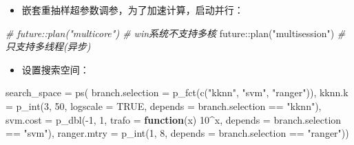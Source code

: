 \documentclass[
  11pt,
  ignorenonframetext,
  dvipsnames,UTF8]{beamer}
\newenvironment{Shaded}{\begin{snugshade}}{\end{snugshade}}
\newcommand{\AttributeTok}[1]{\textcolor[rgb]{0.77,0.63,0.00}{#1}}
\newcommand{\CommentTok}[1]{\textcolor[rgb]{0.56,0.35,0.01}{\textit{#1}}}
\newcommand{\ConstantTok}[1]{\textcolor[rgb]{0.00,0.00,0.00}{#1}}
\newcommand{\ControlFlowTok}[1]{\textcolor[rgb]{0.13,0.29,0.53}{\textbf{#1}}}
\newcommand{\DecValTok}[1]{\textcolor[rgb]{0.00,0.00,0.81}{#1}}
\newcommand{\FunctionTok}[1]{\textcolor[rgb]{0.00,0.00,0.00}{#1}}
\newcommand{\NormalTok}[1]{#1}
\newcommand{\OtherTok}[1]{\textcolor[rgb]{0.56,0.35,0.01}{#1}}
\newcommand{\SpecialCharTok}[1]{\textcolor[rgb]{0.00,0.00,0.00}{#1}}
\newcommand{\StringTok}[1]{\textcolor[rgb]{0.31,0.60,0.02}{#1}}
\providecommand{\tightlist}{%
  \setlength{\itemsep}{0pt}\setlength{\parskip}{0pt}}
\begin{document}
\begin{frame}[fragile]{}
\protect\hypertarget{section-41}{}
\begin{itemize}
\tightlist
\item
  嵌套重抽样超参数调参，为了加速计算，启动并行：
\end{itemize}

\begin{Shaded}
\begin{Highlighting}[]
\CommentTok{\# future::plan("multicore")      \# win系统不支持多核}
\NormalTok{future}\SpecialCharTok{::}\FunctionTok{plan}\NormalTok{(}\StringTok{"multisession"}\NormalTok{)     }\CommentTok{\# 只支持多线程(异步)}
\end{Highlighting}
\end{Shaded}

\begin{itemize}
\tightlist
\item
  设置搜索空间：
\end{itemize}

\begin{Shaded}
\begin{Highlighting}[]
\NormalTok{search\_space }\OtherTok{=} \FunctionTok{ps}\NormalTok{(}
  \AttributeTok{branch.selection =} \FunctionTok{p\_fct}\NormalTok{(}\FunctionTok{c}\NormalTok{(}\StringTok{"kknn"}\NormalTok{, }\StringTok{"svm"}\NormalTok{, }\StringTok{"ranger"}\NormalTok{)),}
  \AttributeTok{kknn.k =} \FunctionTok{p\_int}\NormalTok{(}\DecValTok{3}\NormalTok{, }\DecValTok{50}\NormalTok{, }\AttributeTok{logscale =} \ConstantTok{TRUE}\NormalTok{, }
                 \AttributeTok{depends =}\NormalTok{ branch.selection }\SpecialCharTok{==} \StringTok{"kknn"}\NormalTok{),}
  \AttributeTok{svm.cost =} \FunctionTok{p\_dbl}\NormalTok{(}\SpecialCharTok{{-}}\DecValTok{1}\NormalTok{, }\DecValTok{1}\NormalTok{, }\AttributeTok{trafo =} \ControlFlowTok{function}\NormalTok{(x) }\DecValTok{10}\SpecialCharTok{\^{}}\NormalTok{x, }
                   \AttributeTok{depends =}\NormalTok{ branch.selection }\SpecialCharTok{==} \StringTok{"svm"}\NormalTok{),}
  \AttributeTok{ranger.mtry =} \FunctionTok{p\_int}\NormalTok{(}\DecValTok{1}\NormalTok{, }\DecValTok{8}\NormalTok{, }
                  \AttributeTok{depends =}\NormalTok{ branch.selection }\SpecialCharTok{==} \StringTok{"ranger"}\NormalTok{))}
\end{Highlighting}
\end{Shaded}
\end{frame}
\end{document}
